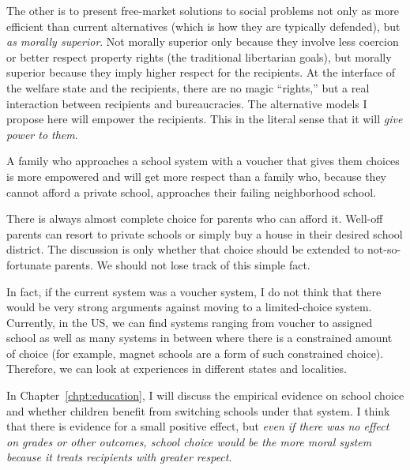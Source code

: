 The other is to present free-market solutions to social problems not only as
more efficient than current alternatives (which is how they are typically
defended), but \emph{as morally superior}. Not morally superior only because
they involve less coercion or better respect property rights (the
traditional libertarian goals), but morally superior because they imply higher
respect for the recipients. At the interface of the welfare state and the
recipients, there are no magic ``rights,'' but a real interaction between
recipients and bureaucracies. The alternative models I propose here will empower
the recipients. This in the literal sense that it will \emph{give power to them}.

A family who approaches a school system with a voucher that gives them choices
is more empowered and will get more respect than a family who, because they
cannot afford a private school, approaches their failing neighborhood school.

There is always almost complete choice for parents who can afford it. Well-off
parents can resort to private schools or simply buy a house in their desired
school district. The discussion is only whether that choice should be extended
to not-so-fortunate parents. We should not lose track of this simple fact.

In fact, if the current system was a voucher system, I do not think that there
would be very strong arguments against moving to a limited-choice system.
Currently, in the US, we can find systems ranging from voucher to assigned
school as well as many systems in between where there is a constrained amount of
choice (for example, magnet schools are a form of such constrained choice).
Therefore, we can look at experiences in different states and localities.

In Chapter~\ref{chpt:education}, I will discuss the empirical evidence on
school choice and whether children benefit from switching schools under that
system. I think that there is evidence for a small positive effect, but
\emph{even if there was no effect on grades or other outcomes, school choice
would be the more moral system because it treats recipients with greater
respect}.

